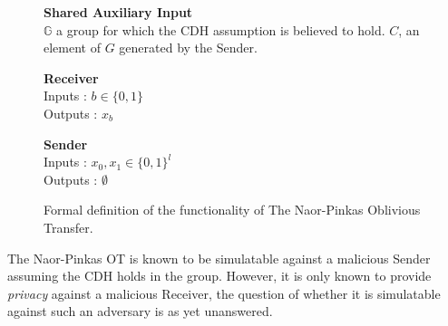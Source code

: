 \documentclass[ %
                    author={Nicholas Tutte},
                supervisor={Prof. Nigel Smart},
                    degree={MEng},
                     title={Secure Two Party Computation},
                  subtitle={A practical comparison of recent protocols},
                      type={Research - GG1K},
                      year={2015} ]{dissertation}
\begin{document}
				\begin{figure}[!htb]
					\centering
					
					\textbf{Shared Auxiliary Input}\\
					$\mathbb{G}$ a group for which the CDH assumption is believed to hold. $C$, an element of $G$ generated by the Sender.\\
					\vspace{0.3cm}
					\begin{minipage}{0.45\textwidth}
						\centering
						\textbf{Receiver}\\
						Inputs : $b \in \{0, 1\}$\\
						Outputs : $x_b$\\
					\end{minipage}
					\begin{minipage}{0.45\textwidth}
						\centering
						\textbf{Sender}\\
						Inputs : $x_0, x_1 \in \{0, 1\}^l$\\
						Outputs : $\emptyset$\\
					\end{minipage}

					\caption{ Formal definition of the functionality of The Naor-Pinkas Oblivious Transfer.\label{fig:NPOT_Functionality}}
				\end{figure}

				The Naor-Pinkas OT is known to be simulatable against a malicious Sender assuming the CDH holds in the group. However, it is only known to provide \emph{privacy} against a malicious Receiver, the question of whether it is simulatable against such an adversary is as yet unanswered.
\end{document}
